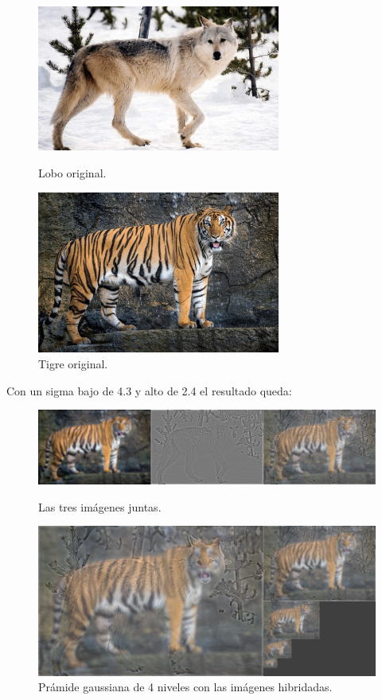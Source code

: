\documentclass[12pt]{article}
\begin{document}
\begin{figure}[H]
\centering
\parbox{8cm}{
\includegraphics[width=8cm]{images/lobo.png}
\caption{Lobo original.}
\label{fig:2figsA}}
\begin{minipage}{8cm}
\includegraphics[width=8cm]{images/tigre.png}
\caption{Tigre original.}
\label{fig:2figsB}
\end{minipage}
\end{figure}

Con un sigma bajo de 4.3 y alto de 2.4 el resultado queda:

\begin{figure}[H]
\centering
\parbox{15cm}{
\includegraphics[width=15cm]{images/ImagenLT.png}
\caption{Las tres imágenes juntas.}
\label{fig:2figsA}}
\begin{minipage}{15cm}
\includegraphics[width=15cm]{images/PirLT.png}
\caption{Prámide gaussiana de 4 niveles con las imágenes hibridadas.}
\label{fig:2figsB}
\end{minipage}
\end{figure}

 
\end{document}
